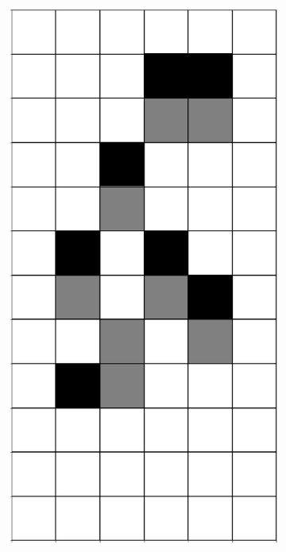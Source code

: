 \documentclass[12pt]{article}
\numberwithin{figure}{section} %
\begin{document}
\begin{figure}[H]
        \begin{subfigure}{0.3\textwidth}
     		\centering
     		\includegraphics[angle=270,width=\linewidth]{Section4/5.2}
     		\subcaption{}
   	\end{subfigure}
	\begin{subfigure}[t]{0.03\textwidth}

\end{subfigure}
\end{figure}
\end{document}
